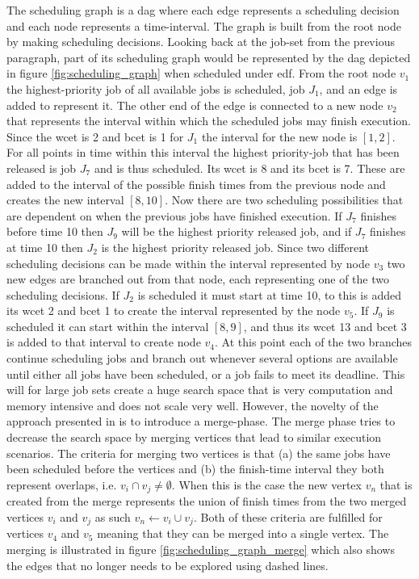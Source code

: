\documentclass{kththesis}
\begin{document}
The scheduling graph is a \acrfull{dag} where each edge represents a scheduling decision and each
node represents a time-interval. The graph is built from the root node by making scheduling
decisions. Looking back at the job-set from the previous paragraph, part of its scheduling graph
would be represented by the \acrshort{dag} depicted in figure \ref{fig:scheduling_graph} when
scheduled under \acrshort{edf}. From the root node $v_1$ the highest-priority job of all available
jobs is scheduled, job $J_1$, and an edge is added to represent it. The other end of the edge is
connected to a new node $v_2$ that represents the interval within which the scheduled jobs may
finish execution. Since the \acrshort{wcet} is 2 and \acrshort{bcet} is 1 for $J_1$ the interval for
the new node is $[1, 2]$. For all points in time within this interval the highest priority-job that
has been released is job $J_7$ and is thus scheduled. Its \acrshort{wcet} is 8 and its
\acrshort{bcet} is 7.  These are added to the interval of the possible finish times from the
previous node and creates the new interval $[8,10]$. Now there are two scheduling possibilities that
are dependent on when the previous jobs have finished execution. If $J_7$ finishes before time 10
then $J_9$ will be the highest priority released job, and if $J_7$ finishes at time 10 then $J_2$ is
the highest priority released job. Since two different scheduling decisions can be made within the
interval represented by node $v_3$ two new edges are branched out from that node, each representing
one of the two scheduling decisions. If $J_2$ is scheduled it must start at time 10, to this is
added its \acrshort{wcet} 2 and \acrshort{bcet} 1 to create the interval represented by the node
$v_5$. If $J_9$ is scheduled it can start within the interval $[8, 9]$, and thus its \acrshort{wcet}
13 and \acrshort{bcet} 3 is added to that interval to create node $v_4$. At this point each of the
two branches continue scheduling jobs and branch out whenever several options are available until
either all jobs have been scheduled, or a job fails to meet its deadline. This will for large job
sets create a huge search space that is very computation and memory intensive and does not scale
very well. However, the novelty of the approach presented in \parencite{nasri_exact_2017} is to
introduce a merge-phase. The merge phase tries to decrease the search space by merging vertices that
lead to similar execution scenarios. The criteria for merging two vertices is that (a) the same jobs
have been scheduled before the vertices and (b) the finish-time interval they both represent
overlaps, i.e. $v_i \cap v_j \neq \emptyset$.  When this is the case the new vertex $v_n$ that is
created from the merge represents the union of finish times from the two merged vertices $v_i$ and
$v_j$ as such $v_n \gets v_i \cup v_j$. Both of these criteria are fulfilled for vertices $v_4$ and
$v_5$ meaning that they can be merged into a single vertex. The merging is illustrated in figure
\ref{fig:scheduling_graph_merge} which also shows the edges that no longer needs to be explored
using dashed lines.
\end{document}
